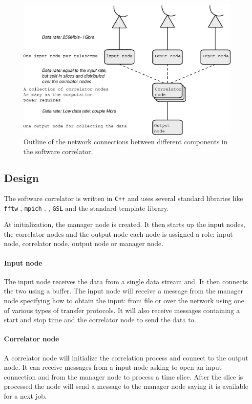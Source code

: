 \begin{figure}
  \centering
  \includegraphics[width=.75\textwidth]
    {img/Network_correlator}
    \caption{Outline of the network connections between different
      components in the software correlator.}
  \label{fig:netw_corr}
\end{figure}


\subsection{Design}
The software correlator is written in \verb~C++~ and uses several
standard libraries like \verb~fftw~ \cite{FFTW05}, \verb~mpich~
\cite{Gropp:1996:HPI}, , \verb~GSL~ \cite{GSL} and the
standard template library.

At initialization, the manager node is created. It then starts up the input nodes, the correlator nodes and the output node each node is assigned a role: input node, correlator
node, output node or manager node. 

\paragraph{Input node}
The input node receives the data from a single data stream and. It then connects the two using a buffer.
The input node will receive a message from the manager node specifying
how to obtain the input: from file or over the network using one of
various types of transfer protocols. It will also receive messages
containing a start and stop time and the correlator node to send the
data to.

\paragraph{Correlator node}
A correlator node will initialize the correlation process and connect
to the output node. It can receive messages from a input node asking to
open an input connection and from the manager node to process a
time slice. After the slice is processed the node will send a message
to the manager node saying it is available for a next job.

